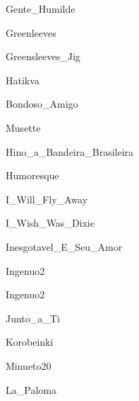 \documentclass{scrartcl}
\begin{document}

{Gente_Humilde}


{Greenleeves}


{Greensleeves_Jig}


{Hatikva}


{Bondoso_Amigo}


{Musette}


{Hino_a_Bandeira_Brasileira}


{Humoresque}


{I_Will_Fly_Away}


{I_Wish_Was_Dixie}


{Inesgotavel_E_Seu_Amor}


{Ingenuo2}


{Ingenuo2}


{Junto_a_Ti}


{Korobeinki}


{Minueto20}


{La_Paloma}
\end{document}
